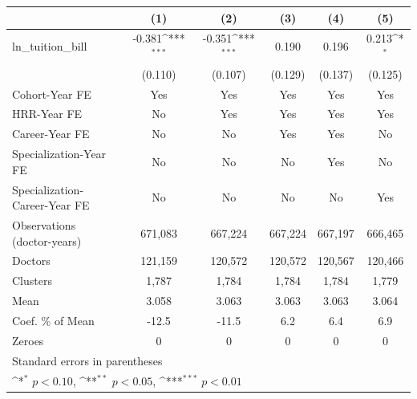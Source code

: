 {
\def\sym#1{\ifmmode^{#1}\else\(^{#1}\)\fi}
\begin{tabular}{l*{5}{c}}
\hline\hline
                    &\multicolumn{1}{c}{(1)}         &\multicolumn{1}{c}{(2)}         &\multicolumn{1}{c}{(3)}         &\multicolumn{1}{c}{(4)}         &\multicolumn{1}{c}{(5)}         \\
\hline
ln\_tuition\_bill     &      -0.381\sym{***}&      -0.351\sym{***}&       0.190         &       0.196         &       0.213\sym{*}  \\
                    &     (0.110)         &     (0.107)         &     (0.129)         &     (0.137)         &     (0.125)         \\
[1em]
Cohort-Year FE      &         Yes         &         Yes         &         Yes         &         Yes         &         Yes         \\
[1em]
HRR-Year FE         &          No         &         Yes         &         Yes         &         Yes         &         Yes         \\
[1em]
Career-Year FE      &          No         &          No         &         Yes         &         Yes         &          No         \\
[1em]
Specialization-Year FE&          No         &          No         &          No         &         Yes         &          No         \\
[1em]
Specialization-Career-Year FE&          No         &          No         &          No         &          No         &         Yes         \\
\hline
Observations (doctor-years)&     671,083         &     667,224         &     667,224         &     667,197         &     666,465         \\
Doctors             &     121,159         &     120,572         &     120,572         &     120,567         &     120,466         \\
Clusters            &       1,787         &       1,784         &       1,784         &       1,784         &       1,779         \\
Mean                &       3.058         &       3.063         &       3.063         &       3.063         &       3.064         \\
Coef. \% of Mean    &       -12.5         &       -11.5         &         6.2         &         6.4         &         6.9         \\
Zeroes              &           0         &           0         &           0         &           0         &           0         \\
\hline\hline
\multicolumn{6}{l}{\footnotesize Standard errors in parentheses}\\
\multicolumn{6}{l}{\footnotesize \sym{*} \(p<0.10\), \sym{**} \(p<0.05\), \sym{***} \(p<0.01\)}\\
\end{tabular}
}

